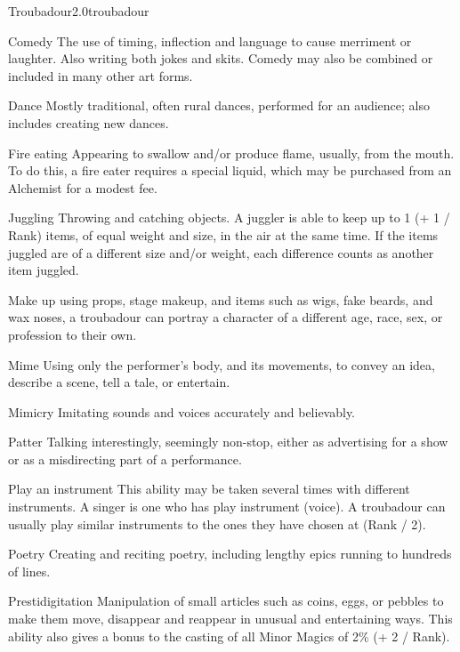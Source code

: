 \begin{skill}{Troubadour}{2.0}{troubadour}
\begin{Description}
\item[Comedy]
The use of timing, inflection and language to cause merriment or
laughter. Also writing both jokes and skits. Comedy may also be
combined or included in many other art forms.

\item[Dance]
Mostly traditional, often rural dances, performed for an
audience; also includes creating new dances.

\item[Fire eating]
Appearing to swallow and/or produce flame, usually, from the mouth.
To do this, a fire eater requires a special liquid, which may be
purchased from an Alchemist for a modest fee.

\item[Juggling]
Throwing and catching objects. A juggler is able to keep up to 1 (+ 1
/ Rank) items, of equal weight and size, in the air at the same time.
If the items juggled are of a different size and/or weight, each
difference counts as another item juggled.

\item[Make up]
using props, stage makeup, and items such as wigs, fake beards, and
wax noses, a troubadour can portray a character of a different age,
race, sex, or profession to their own.

\item[Mime]
Using only the performer's body, and its movements, to convey an idea,
describe a scene, tell a tale, or entertain.

\item[Mimicry]
Imitating sounds and voices accurately and believably.

\item[Patter]
Talking interestingly, seemingly non-stop, either as advertising for a
show or as a misdirecting part of a performance.

\item[Play an instrument]
This ability may be taken several times with different instruments. A
singer is one who has play instrument (voice). A troubadour can
usually play similar instruments to the ones they have chosen at
(Rank / 2).

\item[Poetry]
Creating and reciting poetry, including lengthy epics running to
hundreds of lines.

\item[Prestidigitation]
Manipulation of small articles such as coins, eggs, or pebbles to make
them move, disappear and reappear in unusual and entertaining
ways. This ability also gives a bonus to the casting of all Minor
Magics of 2\% (+ 2 / Rank).


\end{Description}
\end{skill}
